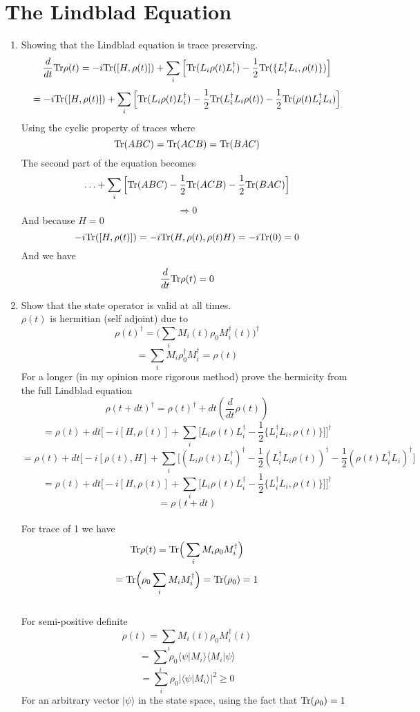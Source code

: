 \documentclass[12pt]{article}
\newcommand{\Tr}{{\rm Tr}}
\newcommand{\ket}[1]{\vert{#1}\rangle}
\begin{document}
\section{The Lindblad Equation}
\begin{enumerate}
    \item Showing that the Lindblad equation is trace preserving. 
    $$ \frac{d}{dt} \Tr \rho (t) = -i \Tr([H, \rho(t)]) + \sum_i \Big[ \Tr(L_i \rho (t) L_i^{\dagger} ) - \frac{1}{2} \Tr ( \{ L_i^{\dagger} L_i, \rho (t) \}) \Big] $$
    $$ = -i \Tr ([H, \rho (t)]) + \sum_i \Big[ \Tr(L_i \rho (t) L_i^{\dagger} ) - \frac{1}{2} \Tr ( L_i^{\dagger} L_i \rho (t) ) - \frac{1}{2} \Tr ( \rho (t) L_i^{\dagger} L_i) \Big] $$
    Using the cyclic property of traces where 
    $$ \Tr (ABC) = \Tr(ACB) = \Tr(BAC) $$ 
    The second part of the equation becomes 
    $$ \ldots + \sum_i \Big[ \Tr (ABC) - \frac{1}{2} \Tr (ACB) - \frac{1}{2} \Tr (BAC) \Big] $$
    $$ \Rightarrow 0 $$
    And because $H=0$ 
    $$ -i \Tr ( [H, \rho (t) ]) = -i \Tr(H, \rho (t) , \rho (t) H) = -i \Tr (0) = 0 $$
    And we have 
    $$ \frac{d}{dt} \Tr \rho (t) = 0 $$

    \item Show that the state operator is valid at all times. 
    \\
    $\rho (t) $ is hermitian (self adjoint) due to 
    $$ \rho (t) ^{\dagger} = \Big( \sum_i M_i (t) \rho_0 M_i^{\dagger} (t) \Big)^{\dagger} $$
    $$ = \sum_i M_i \rho_0^{\dagger} M_i^{\dagger} = \rho (t) $$
    For a longer (in my opinion more rigorous method) prove the hermicity from the full Lindblad equation 
    $$ \rho (t + dt )^{\dagger} = \rho (t) ^{\dagger} + dt(\frac{d}{dt} \rho (t)) $$
    $$ = \rho (t) + dt \Big[  -i [H, \rho(t)] + \sum_i \Big[ L_i \rho (t) L_i^{\dagger}  - \frac{1}{2}   \{ L_i^{\dagger} L_i, \rho (t) \} \Big]  \Big]^{\dagger} $$
    $$ = \rho (t) + dt \Big[  -i [\rho(t), H] + \sum_i \Big[ (L_i \rho (t) L_i^{\dagger})^{\dagger}  - \frac{1}{2} (L_i^{\dagger} L_i \rho(t))^{\dagger}  - \frac{1}{2} (\rho (t) L_i^{\dagger} L_i)^{\dagger}  \Big] $$
    $$ = \rho (t) + dt \Big[  -i [H, \rho(t)] + \sum_i \Big[ L_i \rho (t) L_i^{\dagger}  - \frac{1}{2}   \{ L_i^{\dagger} L_i, \rho (t) \} \Big]  \Big]^{\dagger} $$
    $$ = \rho (t +dt ) $$
    \\
    For trace of 1 we have 
    $$ \Tr \rho (t) = \Tr \Big( \sum_i M_i \rho_0 M_i^{\dagger} \Big) $$
    $$ = \Tr \Big( \rho_0 \sum_i M_i M_i^{\dagger} \Big) = \Tr(\rho_0) = 1$$
    \\
    For semi-positive definite 
    $$ \rho (t) = \sum_i M_i (t) \rho_0 M_i^{\dagger} (t) $$
    $$ = \sum_i \rho_0 \langle \psi | M_i \rangle \langle M_i | \psi \rangle $$
    $$ = \sum_i \rho_0 | \langle \psi | M_i \rangle |^2 \geq 0 $$
    For an arbitrary vector $\ket{\psi}$ in the state space, using the fact that $\Tr (\rho_0) =1$ 

\end{enumerate}
\end{document}
